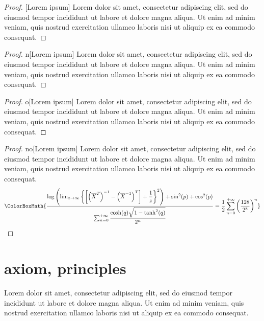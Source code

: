 \begin{proof}{}[Lorem ipsum]
	Lorem dolor sit amet, consectetur adipiscing elit, sed do eiusmod tempor incididunt ut labore et dolore magna aliqua. Ut enim ad minim veniam, quis nostrud exercitation ullamco laboris nisi ut aliquip ex ea commodo consequat.
\end{proof}

\begin{proof}{n}[Lorem ipsum]
	Lorem dolor sit amet, consectetur adipiscing elit, sed do eiusmod tempor incididunt ut labore et dolore magna aliqua. Ut enim ad minim veniam, quis nostrud exercitation ullamco laboris nisi ut aliquip ex ea commodo consequat.
\end{proof}

\begin{proof}{o}[Lorem ipsum]
	Lorem dolor sit amet, consectetur adipiscing elit, sed do eiusmod tempor incididunt ut labore et dolore magna aliqua. Ut enim ad minim veniam, quis nostrud exercitation ullamco laboris nisi ut aliquip ex ea commodo consequat.
\end{proof}

\begin{proof}{no}[Lorem ipsum]
	Lorem dolor sit amet, consectetur adipiscing elit, sed do eiusmod tempor incididunt ut labore et dolore magna aliqua. Ut enim ad minim veniam, quis nostrud exercitation ullamco laboris nisi ut aliquip ex ea commodo consequat.
	\begin{equation*}
		\ColorBoxMath{\dfrac{\log\left(\lim_{z\to\infty}\left\{\left[\left(\overline{X}^{T}\right)^{-1}-\left(\overline{X}^{-1}\right)^T\right]+\dfrac{1}{z}\right\}^2\right)+\sin^2(p)+\cos^2(p)}{\sum_{n=0}^{+\infty}\dfrac{\cosh(q)\sqrt{1-\tanh^2(q)}}{2^n}}=\dfrac{1}{2}\sum_{n=0}^{+\infty}\left(\dfrac{128}{2^8}\right)^n}\qedhere
	\end{equation*}
\end{proof}

\newpage

\section{axiom, principles}

\begin{axiom}{}
	Lorem dolor sit amet, consectetur adipiscing elit, sed do eiusmod tempor incididunt ut labore et dolore magna aliqua. Ut enim ad minim veniam, quis nostrud exercitation ullamco laboris nisi ut aliquip ex ea commodo consequat.
\end{axiom}

